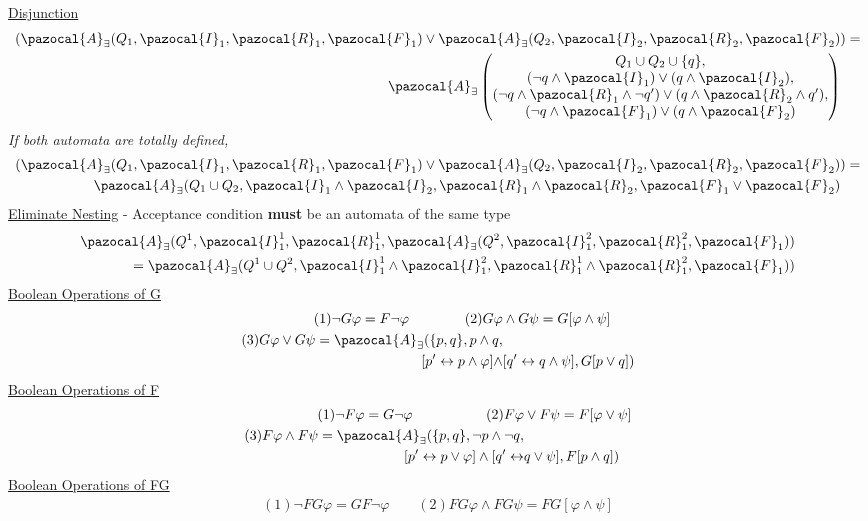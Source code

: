 \documentclass{article}
\newcommand{\Ib}{\pazocal{I}}
\newcommand{\Rb}{\pazocal{R}}
\newcommand{\Ab}{\pazocal{A}}
\newcommand{\Fb}{\pazocal{F}}
\begin{document}
\begin{multicols}{4}
\underline{Disjunction}
\begin{align*}
(\Ab_{\exists}(Q_1,\Ib_1,\Rb_1,\Fb_1)\vee \Ab_{\exists}(Q_2,\Ib_2,\Rb_2,\Fb_2)&)=\\
\Ab_{\exists} \begin{pmatrix}
Q_1 \cup Q_2 \cup \{q\},\\
(\neg q \wedge \Ib_1) \vee (q \wedge \Ib_2), \\
(\neg q \wedge \Rb_1 \wedge \neg q') \vee ( q \wedge \Rb_2 \wedge q'), \\
(\neg q \wedge \Fb_1) \vee (q \wedge \Fb_2)
  \end{pmatrix}
\end{align*}
\textit{If both automata are totally defined,}
\begin{align*}
(\Ab_{\exists}(Q_1,\Ib_1,\Rb_1,\Fb_1)\vee \Ab_{\exists}(Q_2,\Ib_2,\Rb_2,\Fb_2)&)=\\
\Ab_{\exists}(Q_1 \cup Q_2,\Ib_1 \wedge \Ib_2,\Rb_1 \wedge \Rb_2,\Fb_1 \vee \Fb_2)
\end{align*}
\underline{Eliminate Nesting} - Acceptance condition \textbf{must} be an automata of the same type
\begin{align*}
\Ab_{\exists}(Q^1,\Ib_1^1,\Rb_1^1,\Ab_{\exists}(Q^2,\Ib_1^2,\Rb_1^2,\Fb_1))\\
= \Ab_{\exists}(Q^1 \cup Q^2,\Ib_1^1 \wedge \Ib_1^2,\Rb_1^1 \wedge \Rb_1^2,\Fb_1))
\end{align*}
\underline{Boolean Operations of G}
\begin{align*}
(1)\neg G \varphi = F \neg \varphi\qquad \qquad  (2)G \varphi &\wedge G \psi = G[\varphi \wedge \psi]\\
(3) G \varphi \vee G \psi = \Ab_{\exists}(\{p,q\},p \wedge q,&\qquad\qquad\\
[p' \leftrightarrow p \wedge \varphi] \wedge &[q' \leftrightarrow q \wedge \psi],G[p \vee q])
\end{align*}
\underline{Boolean Operations of F}
\begin{align*}
(1)\neg F \varphi = G \neg \varphi\qquad \qquad\quad\;(2)F \varphi &\vee F \psi = F[\varphi \vee \psi]\\
(3) F \varphi \wedge F \psi = \Ab_{\exists}(\{p,q\}, \neg p \wedge \neg q,&\qquad\qquad\\
[p' \leftrightarrow p \vee \varphi] \wedge [q' \leftrightarrow & q \vee \psi],F[p \wedge q])
\end{align*}
\underline{Boolean Operations of FG}
\begin{align*}
(1)\neg FG \varphi = GF \neg \varphi\qquad(2)FG \varphi \wedge FG \psi = FG[\varphi \wedge \psi]\\

\end{align*}
\end{multicols}
\end{document}
